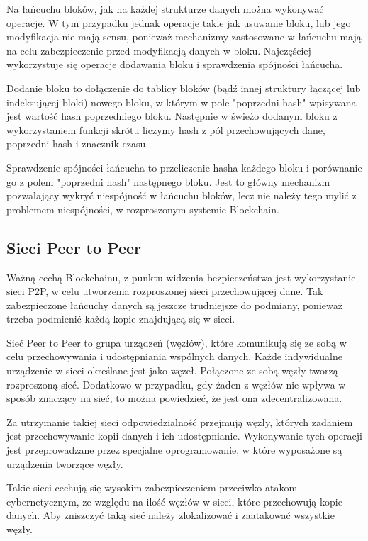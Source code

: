 \documentclass[a4paper,13pt]{report}
\begin{document}
Na łańcuchu bloków, jak na każdej strukturze danych można wykonywać operacje. W tym przypadku jednak operacje takie jak usuwanie bloku, lub jego modyfikacja nie mają sensu, ponieważ mechanizmy zastosowane w łańcuchu mają na celu zabezpieczenie przed modyfikacją danych w bloku. Najczęściej wykorzystuje się operacje dodawania bloku i sprawdzenia spójności łańcucha.

Dodanie bloku to dołączenie do tablicy bloków (bądź innej struktury łączącej lub indeksującej bloki) nowego bloku, w którym w pole "poprzedni hash" wpisywana jest wartość hash poprzedniego bloku. Następnie w świeżo dodanym bloku z wykorzystaniem funkcji skrótu liczymy hash z pól przechowujących dane, poprzedni hash i znacznik czasu.  

Sprawdzenie spójności łańcucha to przeliczenie hasha każdego bloku i porównanie go z polem "poprzedni hash" następnego bloku. Jest to główny mechanizm pozwalający wykryć niespójność w łańcuchu bloków, lecz nie należy tego mylić z problemem niespójności, w rozproszonym systemie Blockchain.

\subsection{Sieci Peer to Peer}

Ważną cechą Blockchainu, z punktu widzenia bezpieczeństwa jest wykorzystanie sieci P2P, w celu utworzenia rozproszonej sieci przechowującej dane. Tak zabezpieczone łańcuchy danych są jeszcze trudniejsze do podmiany, ponieważ trzeba podmienić każdą kopie znajdującą się w sieci.  

Sieć Peer to Peer to grupa urządzeń (węzłów), które komunikują się ze sobą w celu przechowywania i udostępniania wspólnych danych. Każde indywidualne urządzenie w sieci określane jest jako węzeł. Połączone ze sobą węzły tworzą rozproszoną sieć. Dodatkowo w przypadku, gdy żaden z węzłów nie wpływa w sposób znaczący na sieć, to można powiedzieć, że jest ona zdecentralizowana.

Za utrzymanie takiej sieci odpowiedzialność przejmują węzły, których zadaniem jest przechowywanie kopii danych i ich udostępnianie. Wykonywanie tych operacji jest przeprowadzane przez specjalne oprogramowanie, w które wyposażone są urządzenia tworzące węzły.

Takie sieci cechują się wysokim zabezpieczeniem przeciwko atakom cybernetycznym, ze względu na ilość węzłów w sieci, które przechowują kopie danych. Aby zniszczyć taką sieć należy zlokalizować i zaatakować wszystkie węzły.
\end{document}
